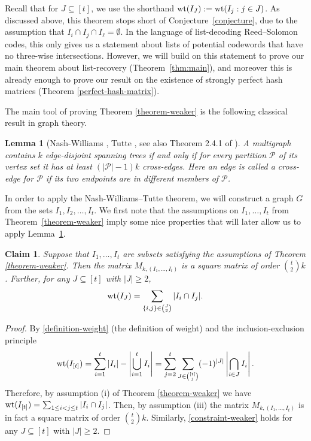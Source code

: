 \documentclass[11pt]{article}
\newtheorem{lemma}[theorem]{Lemma}
\newtheorem{claim}[theorem]{Claim}
\newcommand\black[1]{{\color{black} #1}}
\newcommand{\wt}{{\rm wt}}
\begin{document}
\black{Recall that for $J\subseteq [t]$, we use the shorthand   ${\rm wt}(I_J):={\rm wt}(I_j:j\in J)$.}
As discussed above, this theorem stops short of Conjecture~\ref{conjecture}, due to the assumption that $I_i \cap I_j \cap I_\ell = \emptyset$.  In the language of list-decoding Reed--Solomon codes, this only gives us a statement about lists of potential codewords that have no three-wise intersections.
However, we will build on this statement to prove our main theorem about list-recovery (Theorem~\ref{thm:main}), and moreover this is already enough to
prove our result on the existence of strongly perfect hash matrices (Theorem \ref{perfect-hash-matrix}).

The main tool of proving Theorem \ref{theorem-weaker} is the following classical result in graph theory.

\begin{lemma}[Nash-Williams \cite{nash1961edge}, Tutte \cite{tutte1961problem}, see also Theorem 2.4.1 of \cite{diestel2017graphentheory}]\label{Nash-Williams}
  A multigraph contains $k$ edge-disjoint spanning trees if and only if for every partition $\mathcal{P}$ of its vertex set it has at least $(|\mathcal{P}|-1)k$ cross-edges.
  Here an edge is called a cross-edge for $\mathcal{P}$ if its two endpoints are in different members of $\mathcal{P}$.
\end{lemma}

In order to apply the Nash-Williams--Tutte theorem, we will construct a graph $G$ from the sets $I_1, I_2, \ldots, I_t$.  We first note that the assumptions on $I_1, \ldots, I_t$ from Theorem~\ref{theorem-weaker} imply some nice properties that will later allow us to apply Lemma~\ref{Nash-Williams}.


\begin{claim}\label{cl:size}
Suppose that $I_1,\ldots,I_t$ are subsets satisfying the assumptions of Theorem \ref{theorem-weaker}.
Then the  matrix $M_{k,(I_1,\ldots,I_t)}$ is a square matrix of order $\binom{t}{2}k$. Further, for any $J\subseteq [t]$ with $|J|\ge 2$,
\begin{equation}\label{constraint-weaker}
  {\rm wt}(I_J)=\sum_{\{i,j\}\in\binom{J}{2}}|I_i\cap I_j|.
\end{equation}
\end{claim}

\begin{proof}
By \eqref{definition-weight} (the definition of weight) and the inclusion-exclusion principle \begin{equation}
\label{stam}
{\wt}(I_{[t]})=\sum_{i=1}^t|I_i|-\left|\bigcup_{i=1}^tI_i\right|=\sum_{j=2}^t\sum_{J\in\binom{[t]}{j}}(-1)^{|J|}\left|\bigcap_{i\in J}I_i\right|.
\end{equation} Therefore, by assumption (i) of Theorem \ref{theorem-weaker} we have $\wt(I_{[t]})=\sum_{1\le i<j\le t} |I_i\cap I_j|$. Then, by assumption (iii)
the  matrix $M_{k,(I_1,\ldots,I_t)}$ is in fact a square matrix of order $\binom{t}{2}k$. Similarly, \eqref{constraint-weaker} holds for any $J\subseteq [t]$ with $|J|\ge 2$.
\end{proof}
\end{document}
